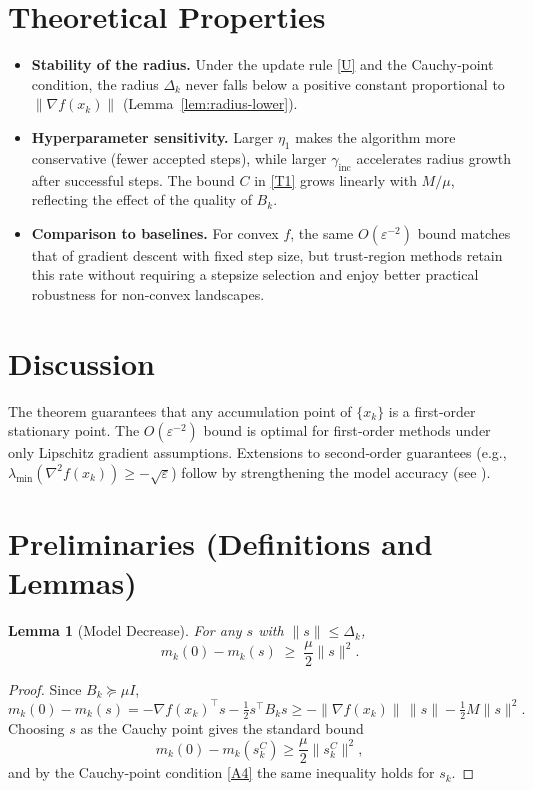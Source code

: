 \documentclass{article}
\newtheorem{lemma}{Lemma}
\begin{document}
\section*{Theoretical Properties}
\begin{itemize}[leftmargin=*]
\item \textbf{Stability of the radius.} Under the update rule \eqref{U} and the Cauchy‑point condition, the radius $\Delta_k$ never falls below a positive constant proportional to $\|\nabla f(x_k)\|$ (Lemma~\ref{lem:radius-lower}).
\item \textbf{Hyperparameter sensitivity.} Larger $\eta_1$ makes the algorithm more conservative (fewer accepted steps), while larger $\gamma_{\text{inc}}$ accelerates radius growth after successful steps. The bound $C$ in \eqref{T1} grows linearly with $M/\mu$, reflecting the effect of the quality of $B_k$.
\item \textbf{Comparison to baselines.} For convex $f$, the same $O(\varepsilon^{-2})$ bound matches that of gradient descent with fixed step size, but trust‑region methods retain this rate without requiring a stepsize selection and enjoy better practical robustness for non‑convex landscapes.
\end{itemize}

\section*{Discussion}
The theorem guarantees that any accumulation point of $\{x_k\}$ is a first‑order stationary point. The $O(\varepsilon^{-2})$ bound is optimal for first‑order methods under only Lipschitz gradient assumptions. Extensions to second‑order guarantees (e.g., $\lambda_{\min}(\nabla^{2}f(x_k))\ge -\sqrt{\varepsilon}$) follow by strengthening the model accuracy (see \cite{conn2000trust}).

\newpage
\section*{Preliminaries (Definitions and Lemmas)}
\begin{lemma}[Model Decrease]\label{lem:model-decrease}
For any $s$ with $\|s\|\le\Delta_k$,
\[
m_k(0)-m_k(s)\;\ge\;\frac{\mu}{2}\|s\|^{2}.
\tag{L1}
\]
\end{lemma}
\begin{proof}
Since $B_k\succeq \mu I$,
\[
m_k(0)-m_k(s)= -\nabla f(x_k)^{\top}s-\tfrac12 s^{\top}B_k s
\ge -\|\nabla f(x_k)\|\,\|s\|-\tfrac12 M\|s\|^{2}.
\]
Choosing $s$ as the Cauchy point gives the standard bound
\[
m_k(0)-m_k(s_k^{C})\ge \frac{\mu}{2}\|s_k^{C}\|^{2},
\]
and by the Cauchy‑point condition \eqref{A4} the same inequality holds for $s_k$.
\end{proof}
\end{document}
